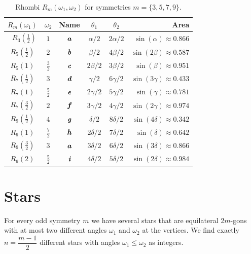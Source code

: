 \documentclass[11pt]{article}
\def\mathbi#1{\textbf{\em #1}}
\begin{document}
\begin{table}[h]
\begin{center}
\begin{tabular}{|c|c|c|c c| r |}
\hline
$R_m(\omega_1)$ & $\omega_2$ & Name & $\theta_1$ & $\theta_2$ & Area \\ \hline\
$R_3(\frac{1}2)$ & $1$  & $\mathbi{a}$ & $\alpha/2$ & $2\alpha/2$  & $\sin(\alpha) \approx 0.866$ \\[0.5ex]
\hline
$R_5(\frac{1}2)$ & $2$  & $\mathbi{b}$ & $\beta/2$  & $4\beta/2$   & $\sin(2\beta) \approx 0.587$\\[0.5ex]
$R_5(1)$ & $\frac{3}2$  & $\mathbi{c}$ & $2\beta/2$ & $3\beta/2$   & $\sin(\beta) \approx 0.951$\\[0.5ex]
\hline
$R_7(\frac{1}2)$ & $3$  & $\mathbi{d}$ & $\gamma/2$ & $6\gamma/2$  & $\sin(3\gamma) \approx 0.433$\\[0.5ex]
$R_7(1)$ & $\frac{5}2$ & $\mathbi{e}$ & $2\gamma/2$ & $5\gamma/2$ & $\sin(\gamma) \approx 0.781$\\[0.5ex]
$R_7(\frac{3}2)$ & $2$  & $\mathbi{f}$ & $3\gamma/2$ & $4\gamma/2$ & $\sin(2\gamma) \approx 0.974$\\[0.5ex]
\hline
$R_9(\frac{1}2)$ & $4$ & $\mathbi{g}$ & $\delta/2$ & $8\delta/2$  & $\sin(4\delta) \approx 0.342$\\[0.5ex]
$R_9(1)$ & $\frac{7}2$ & $\mathbi{h}$ & $2\delta/2$ & $7\delta/2$ & $\sin(\delta) \approx 0.642$\\[0.5ex]
$R_9(\frac{3}2)$ & $3$ & $\mathbi{a}$ & $3\delta/2$ & $6\delta/2$ & $\sin(3\delta) \approx 0.866$\\[0.5ex]
$R_9(2)$ & $\frac{5}2$ & $\mathbi{i}$ & $4\delta/2$ & $5\delta/2$ & $\sin(2\delta) \approx 0.984$\\[0.5ex]
\hline
\end{tabular}
\caption{Rhombi $R_m(\omega_1,\omega_2)$ for symmetries $m=\{3,5,7,9\}$.} 
\label{tbl:rhombi}
\end{center}
\end{table}

\section{Stars}

For every odd symmetry $m$ we have several stars that are equilateral 2$m$-gons with at most two different angles $\omega_1$ and $\omega_2$ at the vertices. We find exactly $n = \dfrac{m-1}2$ different stars with angles $\omega_1 \leq \omega_2$ as integers.
\end{document}
